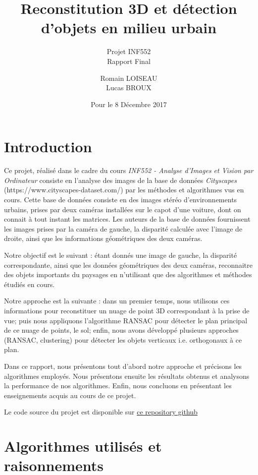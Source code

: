 \documentclass[titlepage,11pt,a4paper]{article}
\title[Projet INF552]{Reconstitution 3D et détection d’objets en milieu urbain}
\subtitle{Projet INF552 \\ Rapport Final}
\author{ Romain \textsc{LOISEAU}\\ Lucas \textsc{BROUX}}
\date{Pour le 8 Décembre 2017}
\begin{document}
\maketitle

\newpage 

\newpage \tableofcontents

\newpage \section{Introduction}
\par Ce projet, réalisé dans le cadre du cours \emph{INF552 - Analyse d'Images et Vision par Ordinateur} consiste en l'analyse des images de la base de données \emph{Cityscapes} (https://www.cityscapes-dataset.com/) par les méthodes et algorithmes vus en cours. Cette base de données consiste en des images stéréo d'environnements urbains, prises par deux caméras installées sur le capot d'une voiture, dont on connait à tout instant les matrices. Les auteurs de la base de données fournissent les images prises par la caméra de gauche, la disparité calculée avec l'image de droite, ainsi que les informations géométriques des deux caméras.
\par Notre objectif est le suivant : étant donnés une image de gauche, la disparité correspondante, ainsi que les données géométriques des deux caméras, reconnaitre des objets importants du paysages en n'utilisant que des algorithmes et méthodes étudiés en cours.
\par Notre approche est la suivante : dans un premier temps, nous utilisons ces informations pour reconstituer un nuage de point 3D correspondant à la prise de vue; puis nous appliquons l'algorithme RANSAC pour détecter le plan principal de ce nuage de points, le sol; enfin, nous avons développé plusieurs approches (RANSAC, clustering) pour détecter les objets verticaux i.e. orthogonaux à ce plan.
\par Dans ce rapport, nous présentons tout d'abord notre approche et précisons les algorithmes employés. Nous présentons ensuite les résultats obtenus et analysons la performance de nos algorithmes. Enfin, nous concluons en présentant les enseignements acquis au cours de ce projet.
\par Le code source du projet est disponible sur \href{https://github.com/lucas-broux/Projet-Inf552}{ce repository github}



\newpage \section{Algorithmes utilisés et raisonnements}
\end{document}
